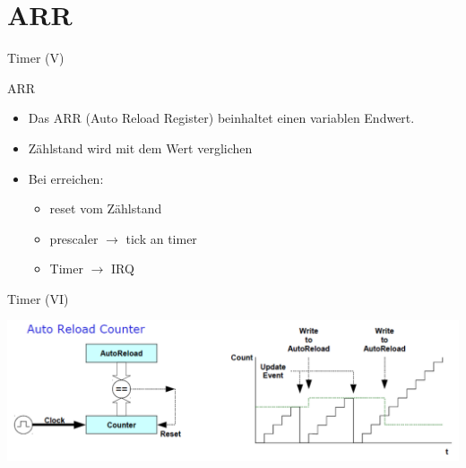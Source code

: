   \section{ARR}
  \begin{frame}{Timer (V)}
    \begin{block} {ARR}
      \begin{itemize}
        \item Das ARR (Auto Reload Register) beinhaltet einen variablen Endwert.
        \item Zählstand wird mit dem Wert verglichen
        \item Bei erreichen:
        \begin{itemize}
          \item reset vom Zählstand
          \item prescaler $\rightarrow$ tick an timer
          \item Timer $\rightarrow$ IRQ
        \end{itemize}
      \end{itemize}
    \end{block}
  \end{frame}

  \begin{frame}{Timer (VI)}
    \begin{center}
      \includegraphics[width=\textwidth]{figs/ARPE_disable}
    \end{center}
  \end{frame}

